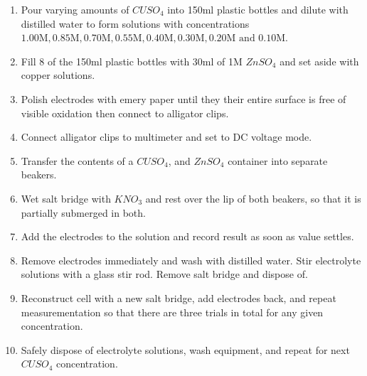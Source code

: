 \documentclass[11pt,a4paper]{article}
\begin{document}
\begin{enumerate}
	\item Pour varying amounts of $CUSO_4$ into 150ml plastic bottles and dilute with distilled water to form solutions with concentrations $1.00\textrm{M}, 0.85\textrm{M}, 0.70\textrm{M}, 0.55\textrm{M}, 0.40\textrm{M}, 0.30\textrm{M}, 0.20\textrm{M and } 0.10\textrm{M}$.
	
	\item Fill 8 of the 150ml plastic bottles with 30ml of 1M $ZnSO_4$ and set aside with copper solutions. 
	
	\item Polish electrodes with emery paper until they their entire surface is free of visible oxidation then connect to alligator clips.
	
	\item Connect alligator clips to multimeter and set to DC voltage mode.
	
	\item Transfer the contents of a $CUSO_4$, and $ZnSO_4$ container into separate beakers.
	
	\item Wet salt bridge with $KNO_3$ and rest over the lip of both beakers, so that it is partially submerged in both. 
	
	\item Add the electrodes to the solution and record result as soon as value settles.
	
	\item Remove electrodes immediately and wash with distilled water. Stir electrolyte solutions with a glass stir rod. Remove salt bridge and dispose of.
	
	\item Reconstruct cell with a new salt bridge, add electrodes back, and repeat measurementation so that there are three trials in total for any given concentration.
	
	\item Safely dispose of electrolyte solutions, wash equipment, and repeat for next $CUSO_4$ concentration.
\end{enumerate}
\end{document}
